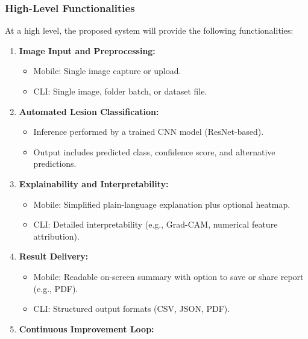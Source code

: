 \documentclass[
  12pt,
  oneside]{article}
\providecommand{\tightlist}{%
  \setlength{\itemsep}{0pt}\setlength{\parskip}{0pt}}
\begin{document}
\subsubsection{High-Level
Functionalities}\label{high-level-functionalities}

At a high level, the proposed system will provide the following
functionalities:

\begin{enumerate}
\def\labelenumi{\arabic{enumi}.}
\item
  \textbf{Image Input and Preprocessing:}

  \begin{itemize}
  \tightlist
  \item
    Mobile: Single image capture or upload.\\
  \item
    CLI: Single image, folder batch, or dataset file.
  \end{itemize}
\item
  \textbf{Automated Lesion Classification:}

  \begin{itemize}
  \tightlist
  \item
    Inference performed by a trained CNN model (ResNet-based).\\
  \item
    Output includes predicted class, confidence score, and alternative
    predictions.
  \end{itemize}
\item
  \textbf{Explainability and Interpretability:}

  \begin{itemize}
  \tightlist
  \item
    Mobile: Simplified plain-language explanation plus optional
    heatmap.\\
  \item
    CLI: Detailed interpretability (e.g., Grad-CAM, numerical feature
    attribution).
  \end{itemize}
\item
  \textbf{Result Delivery:}

  \begin{itemize}
  \tightlist
  \item
    Mobile: Readable on-screen summary with option to save or share
    report (e.g., PDF).\\
  \item
    CLI: Structured output formats (CSV, JSON, PDF).
  \end{itemize}
\item
  \textbf{Continuous Improvement Loop:}


\end{enumerate}
\end{document}
